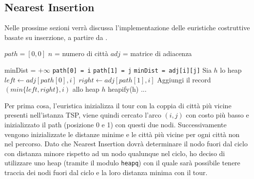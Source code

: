 \documentclass[a4paper,12pt]{report}
\begin{document}
\subsection{Nearest Insertion}
Nelle prossime sezioni verrà discussa l'implementazione delle euristiche costruttive basate su inserzione, a partire da .
\begin{tcolorbox}[colframe=black, colback=white, boxrule=0.5pt, title=Nearest Insertion, coltitle=black, fonttitle=\bfseries, colbacktitle=white, breakable]
  \begin{algorithmic}[1]
    \State $path = [0, 0]$
    \State $n$ = numero di città
    \State $adj$ = matrice di adiacenza

    \State minDist = $+\infty$
          \State \texttt{path[0] = i}
          \State \texttt{path[1] = j}
          \State \texttt{minDist = adj[i][j]}
        \EndIf
      \EndFor
    \EndFor
    \State Sia $h$ lo heap
      \State $left \gets adj[path[0], i]$
      \State $right \gets adj[path[1], i]$
      \State Aggiungi il record $(min\{left, right\}, i)$ allo heap $h$
    \EndFor
    \State heapify(h)
    \State ...
  \end{algorithmic}
\end{tcolorbox}
Per prima cosa, l'euristica inizializza il tour con la coppia di città più vicine presenti nell'istanza TSP, viene quindi cercato l'arco $(i, j)$ con costo più basso e inizializzato il path (posizione 0 e 1) con questi due nodi.
Successivamente vengono inizializzate le distanze minime e le città più vicine per ogni città non nel percorso. Dato che Nearest Insertion dovrà determinare il nodo fuori dal ciclo con distanza minore rispetto ad un nodo qualunque nel ciclo, ho deciso di utilizzare uno heap (tramite il modulo \lstinline!heapq!) con il quale sarà possibile tenere traccia dei nodi fuori dal ciclo e la loro distanza minima con il tour.
\end{document}

